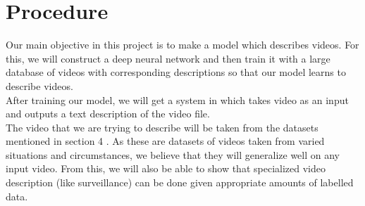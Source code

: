 \documentclass[11pt]{article}
\begin{document}
	\section{Procedure}
		
		Our main objective in this project is to make a model which describes videos. For this, we will construct a deep neural network and then train it with a large database of videos with corresponding descriptions so that our model learns to describe videos.\\
		After training our model, we will get a system in which takes video as an input and outputs a text description of the video file.\\
		The video that we are trying to describe will be taken from the datasets mentioned in section 4 . As these are datasets of videos taken from varied situations and circumstances, we believe that they will generalize well on any input video. From this, we will also be able to show that specialized video description (like surveillance) can be done given appropriate amounts of labelled data.
\end{document}
